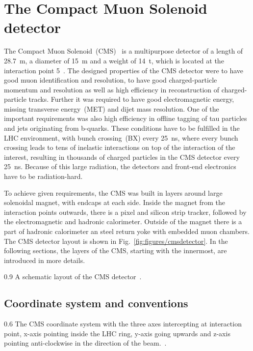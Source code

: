 \newpage

\section{The Compact Muon Solenoid detector~\label{sec:CMS}}

The Compact Muon Solenoid~(CMS)~\cite{Chatrchyan:2008aa, CMSproposal} is a multipurpose detector of a length of 28.7~m, a diameter of 15~m and a weight of 14~t,  which is located at the interaction point 5~\cite{Chatrchyan:2008aa}. The designed properties of the CMS  detector were to have good muon identification and resolution, to have good charged-particle momentum and resolution as well as high efficiency in reconstruction of charged-particle tracks. Further it was required to have good electromagnetic energy, missing transverse energy~(MET) and dijet mass resolution. One of the important requirements was also high efficiency in offline tagging of tau particles and jets originating from b-quarks. These conditions have to be fulfilled in the LHC environment, with bunch crossing~(BX) every 25~ns, where every bunch crossing leads to tens of inelastic interactions on top of the interaction of the interest, resulting in thousands of charged particles in the CMS detector every 25~ns. Because of this large radiation, the detectors and front-end electronics have to be radiation-hard.

To achieve given requirements, the CMS was built in layers around large solenoidal magnet, with endcaps at each side. Inside the magnet from the interaction points outwards, there is a pixel and silicon strip tracker, followed by the electromagnetic and hadronic calorimeter. Outside of the magnet there is a part of hadronic calorimeter an steel return yoke with embedded muon chambers. The CMS detector layout is shown in Fig.~\ref{fig:figures/cmsdetector}. In the following sections, the layers of the CMS, starting with the innermost, are introduced in more details.


                 {0.9}       %
                 { A schematic layout of the CMS detector~\cite{website:CMSdet}. }

\subsection{Coordinate system and conventions}

                 {0.6}       %
                 { The CMS coordinate system with the three axes intercepting at interaction point, x-axis pointing inside the LHC ring, y-axis going upwards and z-axis pointing anti-clockwise in the direction of the beam.~\cite{Pantaleo:2293435}. }

